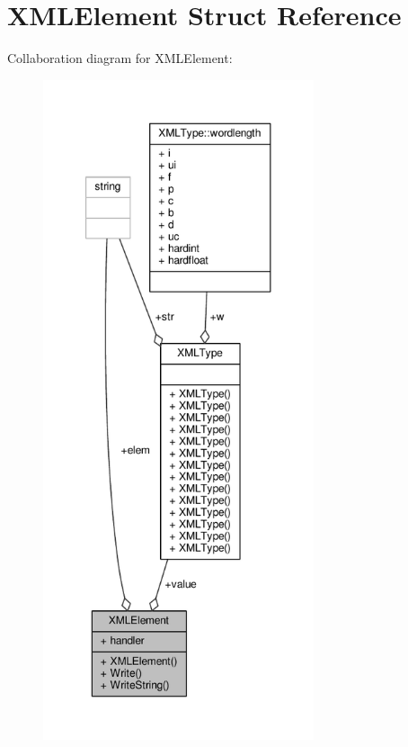 \hypertarget{structXMLElement}{}\section{X\+M\+L\+Element Struct Reference}
\label{structXMLElement}


Collaboration diagram for X\+M\+L\+Element\+:
\nopagebreak
\begin{figure}[H]
\begin{center}
\leavevmode
\includegraphics[height=550pt]{d9/d27/structXMLElement__coll__graph}
\end{center}
\end{figure}
